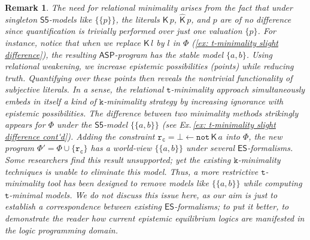 \documentclass[submission,copyright,creativecommons]{eptcs}
\newcommand{\set}[1]  { \{ #1 \} }
\newcommand{\logic}[1]  { \ensuremath{\mathsf{#1}} }
\newcommand{\sfive}  { \logic{S5} }
\newcommand{\ASP}  { \logic{ASP} }
\newcommand{\ES}  { \logic{ES} }
\newcommand{\lpnot}  { \mathtt{not} \, }
\newcommand{\K}  { \mathsf{K} }
\newcommand{\Khat}  { \hat{\mathsf{K}} }
\newtheorem{rem}{Remark}
\begin{document}
\begin{rem} \normalfont
The need for relational minimality arises from the fact that under singleton $\sfive$-models like $\set{\set{p}}$, the literals $\K\,p$, $\Khat\,p$, and $p$ are of no difference since quantification is trivially performed over just one valuation $\set p$.
For instance, notice that when we replace $\K\,l$ by $l$ in $\Phi$ 
(\ref{ex: t-minimality slight difference}), 
the resulting $\ASP$-program has the stable model $\set{a,b}$. 
Using relational weakening, we increase epistemic possibilities 
(points) while reducing truth. Quantifying over these points then reveals the nontrivial functionality of subjective literals.
In a sense, the relational $\texttt{t}$-minimality approach simultaneously embeds in itself a kind of $\texttt{k}$-minimality strategy by increasing ignorance with epistemic possibilities.
The difference between two minimality methods strikingly appears for $\Phi$
under the $\sfive$-model $\set{\set{a,b}}$ (see Ex.\,\ref{ex: t-minimality slight difference cont'd}). 
Adding the constraint 
$\mathtt{r_c}=\bot \leftarrow \lpnot \K\,a$ into $\Phi$, the new program 
$\Phi'=\Phi \cup \set{\mathtt{r_c}}$ has a world-view $\set{\set{a,b}}$ under several $\ES$-formalisms.
Some researchers find this result unsupported; 
yet the existing $\texttt{k}$-minimality techniques is unable to eliminate this model. 
Thus, a more restrictive $\texttt{t}$-minimality tool has been designed
to remove models like $\set{\set{a,b}}$ while computing $\texttt{t}$-minimal models.  
We do not discuss this issue here, as our aim is just to establish a correspondence between existing $\ES$-formalisms; to put it better, to demonstrate the reader how current epistemic equilibrium logics are manifested 
in the logic programming domain.
\end{rem}
\end{document}
